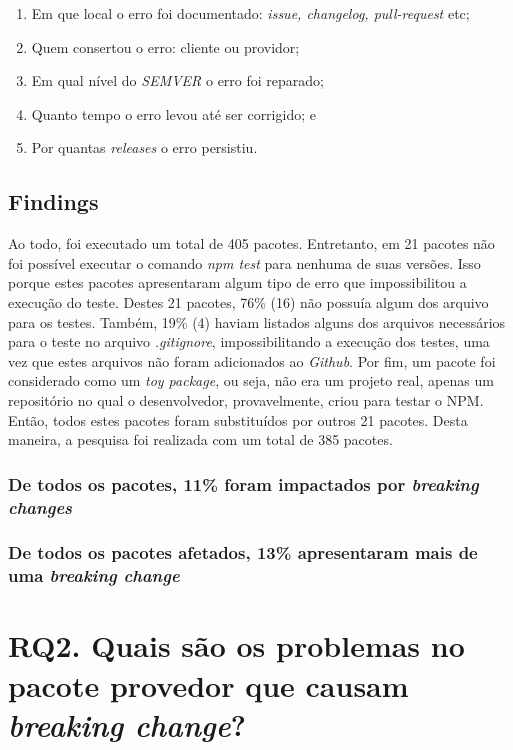\begin{enumerate}
    \item Em que local o erro foi documentado: \textit{issue, changelog, pull-request} etc;
    \item Quem consertou o erro: cliente ou providor;
    \item Em qual nível do \textit{SEMVER} o erro foi reparado;
    \item Quanto tempo o erro levou até ser corrigido; e
    \item Por quantas \textit{releases} o erro persistiu.
\end{enumerate}{}

\subsection{Findings}
\label{fin:rq1}
Ao todo, foi executado um total de 405 pacotes. Entretanto, em 21 pacotes não foi possível executar o comando \textit{npm test} para nenhuma de suas versões. Isso porque estes pacotes apresentaram algum tipo de erro que impossibilitou a execução do teste. Destes 21 pacotes, 76\% (16) não possuía algum dos arquivo para os testes. Também, 19\% (4) haviam listados alguns dos arquivos necessários para o teste no arquivo \textit{.gitignore}, impossibilitando a execução dos testes, uma vez que estes arquivos não foram adicionados ao \textit{Github}. Por fim, um pacote foi considerado como um \textit{toy package}, ou seja, não era um projeto real, apenas um repositório no qual o desenvolvedor, provavelmente, criou para testar o \gls{NPM}. Então, todos estes pacotes foram substituídos por outros 21 pacotes. Desta maneira, a pesquisa foi realizada com um total de 385 pacotes.

\subsubsection{De todos os pacotes, 11\% foram impactados por \textit{breaking changes}}


\subsubsection{De todos os pacotes afetados, 13\% apresentaram mais de uma \textit{breaking change}}

\section{RQ2. Quais são os problemas no pacote provedor que causam \textit{breaking change}?}
\label{sec:rq2}

